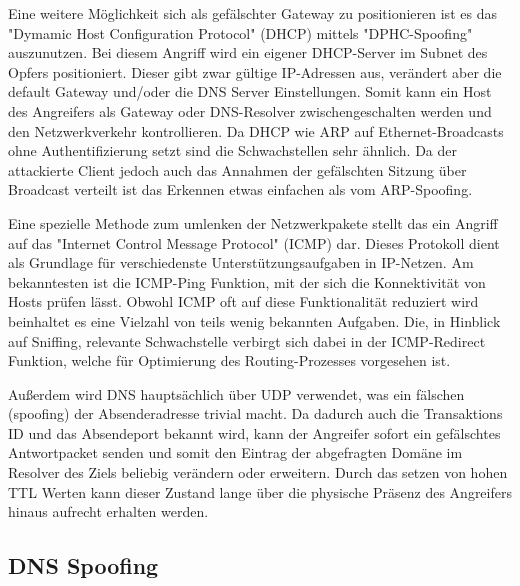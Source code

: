 Eine weitere Möglichkeit sich als gefälschter Gateway zu positionieren ist es das "Dymamic Host Configuration Protocol" (DHCP) mittels "DPHC-Spoofing" auszunutzen. Bei diesem Angriff wird ein eigener DHCP-Server im Subnet des Opfers positioniert. Dieser gibt zwar gültige IP-Adressen aus, verändert aber die default Gateway und/oder die DNS Server Einstellungen. Somit kann ein Host des Angreifers als Gateway oder DNS-Resolver zwischengeschalten werden und den Netzwerkverkehr kontrollieren. Da DHCP wie ARP auf Ethernet-Broadcasts ohne Authentifizierung setzt sind die Schwachstellen sehr ähnlich. Da der attackierte Client jedoch auch das Annahmen der gefälschten Sitzung über Broadcast verteilt ist das Erkennen etwas einfachen als vom ARP-Spoofing. 

Eine spezielle Methode zum umlenken der Netzwerkpakete stellt das ein Angriff auf das "Internet Control Message Protocol" (ICMP) dar. Dieses Protokoll dient als Grundlage für verschiedenste Unterstützungsaufgaben in IP-Netzen. Am bekanntesten ist die ICMP-Ping Funktion, mit der sich die Konnektivität von Hosts prüfen lässt. Obwohl ICMP oft auf diese Funktionalität reduziert wird beinhaltet es eine Vielzahl von teils wenig bekannten Aufgaben. Die, in Hinblick auf Sniffing, relevante Schwachstelle verbirgt sich dabei in der ICMP-Redirect Funktion, welche für Optimierung des Routing-Prozesses vorgesehen ist. 

Außerdem wird DNS hauptsächlich über UDP verwendet, was ein fälschen (spoofing) der Absenderadresse trivial macht. Da dadurch auch die Transaktions ID und das Absendeport bekannt wird, kann der Angreifer sofort ein gefälschtes Antwortpacket senden und somit den Eintrag der abgefragten Domäne im Resolver des Ziels beliebig verändern oder erweitern. Durch das setzen von hohen TTL Werten kann dieser Zustand lange über die physische Präsenz des Angreifers hinaus aufrecht erhalten werden.



\subsection{DNS Spoofing}



